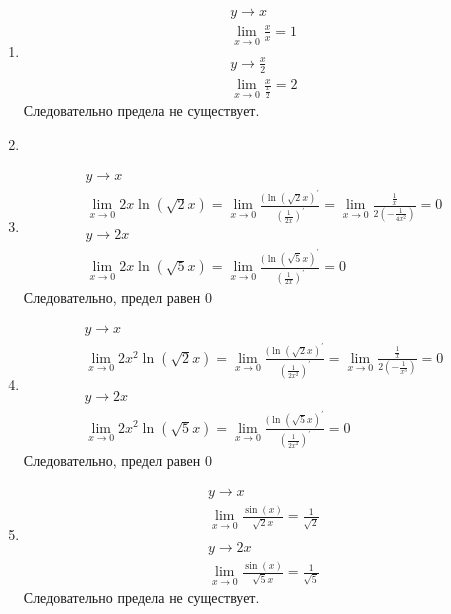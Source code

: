 		
		\subsection{}
		\begin{enumerate}
		\item 
			\begin{gather*}
				y \to x\\
				\lim\limits_{x \to 0}\frac{x}{x} = 1\\
				\\
				y \to \frac{x}{2}\\
				\lim\limits_{x \to 0}\frac{x}{\frac{x}{2}} = 2
			\end{gather*}
			Следовательно предела не существует.
		
		\item 
		
		\item 
			\begin{gather*}
				y \to x\\
				\lim\limits_{x \to 0}2x\ln(\sqrt{2}x) = 
				\lim\limits_{x \to 0}\frac{(\ln(\sqrt{2}x)^{\prime}}{(\frac{1}{2x})^{\prime}} = 
				\lim\limits_{x \to 0}\frac{\frac{1}{x}}{2( - \frac{1}{4x^2})} = 0
				\\
				y \to 2x\\
				\lim\limits_{x \to 0}2x\ln(\sqrt{5}x) = 
				\lim\limits_{x \to 0}\frac{(\ln(\sqrt{5}x)^{\prime}}{(\frac{1}{2x})^{\prime}} = 0
			\end{gather*}
			Следовательно, предел равен $0$
		
		\item 
			\begin{gather*}
				y \to x\\
				\lim\limits_{x \to 0}2x^2\ln(\sqrt{2}x) = 
				\lim\limits_{x \to 0}\frac{(\ln(\sqrt{2}x)^{\prime}}{(\frac{1}{2x^2})^{\prime}} = 
				\lim\limits_{x \to 0}\frac{\frac{1}{x}}{2( - \frac{1}{x^3})} = 0\\
				\\
				y \to 2x\\
				\lim\limits_{x \to 0} 2x^2 \ln(\sqrt{5}x) = 
				\lim\limits_{x \to 0}\frac{(\ln(\sqrt{5}x)^{\prime}}{(\frac{1}{2x^2})^{\prime}} = 0
			\end{gather*}		
			Следовательно, предел равен $0$
		
		\item 
			\begin{gather*}
				y \to x\\
				\lim\limits_{x \to 0}\frac{\sin(x)}{\sqrt{2}x} = \frac{1}{\sqrt{2}}\\
				\\
				y \to 2x\\
				\lim\limits_{x \to 0}\frac{\sin(x)}{\sqrt{5}x} = \frac{1}{\sqrt{5}}
			\end{gather*}
			Следовательно предела не существует.
		

\end{enumerate}
